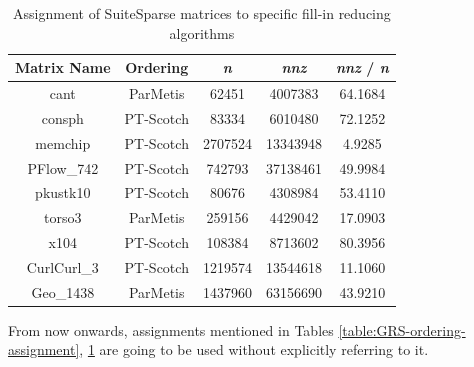 \begin{table}[htpb]
\centering
\begin{tabular}{|c|c|c|c|c|}
\hline
Matrix Name & Ordering  & \textit{n}       & \textit{nnz}      & \textit{nnz} / \textit{n} \\ \hline
cant        & ParMetis  & 62451   & 4007383  & 64.1684 \\ \hline
consph      & PT-Scotch & 83334   & 6010480  & 72.1252 \\ \hline
memchip     & PT-Scotch & 2707524 & 13343948 & 4.9285  \\ \hline
PFlow\_742  & PT-Scotch & 742793  & 37138461 & 49.9984 \\ \hline
pkustk10    & PT-Scotch & 80676   & 4308984  & 53.4110 \\ \hline
torso3      & ParMetis  & 259156  & 4429042  & 17.0903 \\ \hline
x104        & PT-Scotch & 108384  & 8713602  & 80.3956 \\ \hline
CurlCurl\_3 & PT-Scotch & 1219574 & 13544618 & 11.1060 \\ \hline
Geo\_1438   & ParMetis  & 1437960 & 63156690 & 43.9210 \\ \hline
\end{tabular}
\caption{Assignment of SuiteSparse matrices to specific fill-in reducing algorithms}
\label{table:SuiteSparse-ordering-assignment}
\end{table}


From now onwards, assignments mentioned in Tables \ref{table:GRS-ordering-assignment}, \ref{table:SuiteSparse-ordering-assignment} are going to be used without explicitly referring to it.\\
